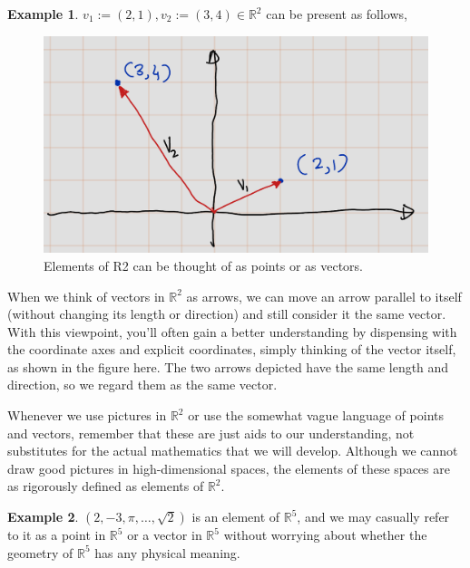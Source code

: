 \documentclass[
]{book}
\theoremstyle{definition}
\theoremstyle{definition}
\newtheorem{example}{Example}[chapter]
\theoremstyle{definition}
\theoremstyle{definition}
\theoremstyle{remark}
\begin{document}
\begin{example}
\protect\hypertarget{exm:unnamed-chunk-18}{}\label{exm:unnamed-chunk-18}\(v_1:=(2,1),v_2:=(3,4)\in \mathbb{R}^2\) can be present as follows,
\end{example}

\begin{figure}
\includegraphics[width=16.74in]{fig/Chapter-1/fig4} \caption{Elements of R2 can be thought of as points or as vectors.}\label{fig:unnamed-chunk-19}
\end{figure}

When we think of vectors in \(\mathbb{R}^2\) as arrows, we can move an arrow parallel to itself (without changing its length or direction) and still consider it the same vector. With this viewpoint, you'll often gain a better understanding by dispensing with the coordinate axes and explicit coordinates, simply thinking of the vector itself, as shown in the figure here. The two arrows depicted have the same length and direction, so we regard them as the same vector.

Whenever we use pictures in \(\mathbb{R}^2\) or use the somewhat vague language of points and vectors, remember that these are just aids to our understanding, not substitutes for the actual mathematics that we will develop. Although we cannot draw good pictures in high-dimensional spaces, the elements of these spaces are as rigorously defined as elements of \(\mathbb{R}^2\).

\begin{example}
\protect\hypertarget{exm:unnamed-chunk-20}{}\label{exm:unnamed-chunk-20}\((2, -3, \pi, \ldots, \sqrt{2})\) is an element of \(\mathbb{R}^5\), and we may casually refer to it as a point in \(\mathbb{R}^5\) or a vector in \(\mathbb{R}^5\) without worrying about whether the geometry of \(\mathbb{R}^5\) has any physical meaning.
\end{example}
\end{document}
